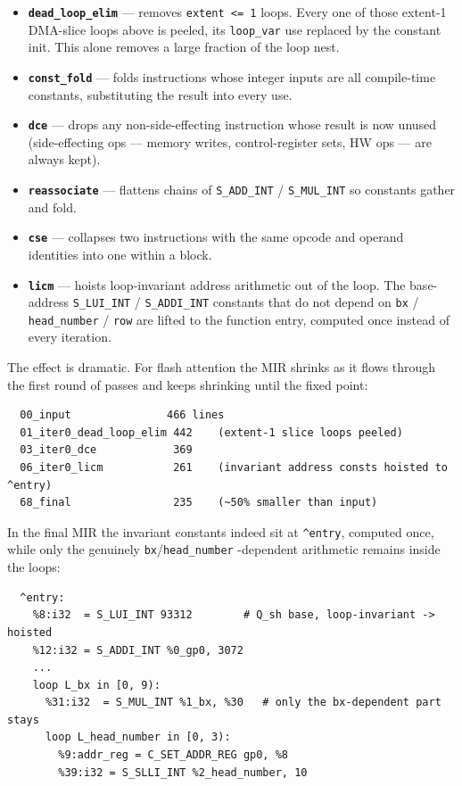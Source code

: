 \documentclass[
  10pt,
]{article}
\begin{document}
\begin{itemize}
\item
  \textbf{\texttt{dead\_loop\_elim}} --- removes \texttt{extent <= 1}
  loops. Every one of those extent-1 DMA-slice loops above is peeled, its
  \texttt{loop\_var} use replaced by the constant init. This alone
  removes a large fraction of the loop nest.
\item
  \textbf{\texttt{const\_fold}} --- folds instructions whose integer
  inputs are all compile-time constants, substituting the result into
  every use.
\item
  \textbf{\texttt{dce}} --- drops any non-side-effecting instruction
  whose result is now unused (side-effecting ops --- memory writes,
  control-register sets, HW ops --- are always kept).
\item
  \textbf{\texttt{reassociate}} --- flattens chains of
  \texttt{S\_ADD\_INT} / \texttt{S\_MUL\_INT} so constants gather and
  fold.
\item
  \textbf{\texttt{cse}} --- collapses two instructions with the same
  opcode and operand identities into one within a block.
\item
  \textbf{\texttt{licm}} --- hoists loop-invariant address arithmetic out
  of the loop. The base-address \texttt{S\_LUI\_INT} / \texttt{S\_ADDI\_INT}
  constants that do not depend on \texttt{bx} / \texttt{head\_number} /
  \texttt{row} are lifted to the function entry, computed once instead of
  every iteration.
\end{itemize}

The effect is dramatic. For flash attention the MIR shrinks as it flows
through the first round of passes and keeps shrinking until the fixed
point:

\begin{verbatim}
  00_input               466 lines
  01_iter0_dead_loop_elim 442    (extent-1 slice loops peeled)
  03_iter0_dce            369
  06_iter0_licm           261    (invariant address consts hoisted to ^entry)
  68_final                235    (~50% smaller than input)
\end{verbatim}

In the final MIR the invariant constants indeed sit at \texttt{\textasciicircum{}entry},
computed once, while only the genuinely \texttt{bx}/\texttt{head\_number}
-dependent arithmetic remains inside the loops:

\begin{verbatim}
  ^entry:
    %8:i32  = S_LUI_INT 93312        # Q_sh base, loop-invariant -> hoisted
    %12:i32 = S_ADDI_INT %0_gp0, 3072
    ...
    loop L_bx in [0, 9):
      %31:i32  = S_MUL_INT %1_bx, %30   # only the bx-dependent part stays
      loop L_head_number in [0, 3):
        %9:addr_reg = C_SET_ADDR_REG gp0, %8
        %39:i32 = S_SLLI_INT %2_head_number, 10
\end{verbatim}
\end{document}
